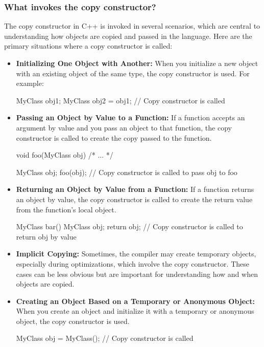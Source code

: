 \documentclass{report}
\begin{document}
    \subsubsection{What invokes the copy constructor?}
    \bigbreak \noindent 
    The copy constructor in C++ is invoked in several scenarios, which are central to understanding how objects are copied and passed in the language. Here are the primary situations where a copy constructor is called:
    \begin{itemize}
        \item \textbf{Initializing One Object with Another:} When you initialize a new object with an existing object of the same type, the copy constructor is used. For example:
            \bigbreak \noindent 
            \begin{cppcode}
            MyClass obj1;
            MyClass obj2 = obj1; // Copy constructor is called
            \end{cppcode}
        \item \textbf{Passing an Object by Value to a Function:} If a function accepts an argument by value and you pass an object to that function, the copy constructor is called to create the copy passed to the function.
            \bigbreak \noindent 
            \begin{cppcode}
            void foo(MyClass obj) { /* ... */ }

            MyClass obj;
            foo(obj); // Copy constructor is called to pass obj to foo
            \end{cppcode}
        \item \textbf{Returning an Object by Value from a Function:} If a function returns an object by value, the copy constructor is called to create the return value from the function's local object.
            \bigbreak \noindent 
            \begin{cppcode}
            MyClass bar() {
                MyClass obj;
                return obj; // Copy constructor is called to return obj by value
            }
            \end{cppcode}
        \item \textbf{Implicit Copying:} Sometimes, the compiler may create temporary objects, especially during optimizations, which involve the copy constructor. These cases can be less obvious but are important for understanding how and when objects are copied.
        \item \textbf{Creating an Object Based on a Temporary or Anonymous Object:} When you create an object and initialize it with a temporary or anonymous object, the copy constructor is used.
            \bigbreak \noindent 
            \begin{cppcode}
            MyClass obj = MyClass(); // Copy constructor is called
            \end{cppcode}
    \end{itemize}
\end{document}
